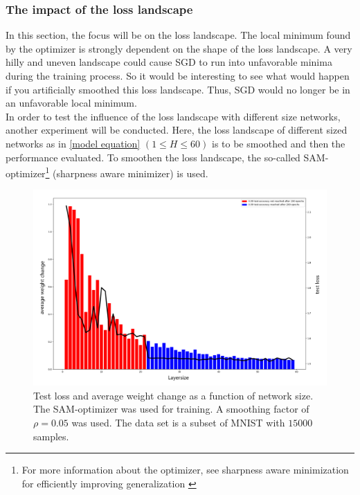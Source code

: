 \newpage
\subsubsection{The impact of the loss landscape}

In this section, the focus will be on the loss landscape. The local minimum found by the optimizer is strongly dependent on the shape of the loss landscape. A very hilly and uneven landscape could cause SGD to run into unfavorable minima during the training process.
So it would be interesting to see what would happen if you artificially smoothed this loss landscape. Thus, SGD would no longer be in an unfavorable local minimum.  \\
In order to test the influence of the loss landscape with different size networks, another experiment will be conducted. Here, the loss landscape of different sized networks as in \ref{model equation} $(1 \leq H \leq 60)$ is to be smoothed and then the performance evaluated. 
To smoothen the loss landscape, the so-called SAM-optimizer\footnote{ For more information about the optimizer, see sharpness aware minimization for efficiently improving generalization \cite{sam_optimizer}
} (sharpness aware minimizer) is used.



\begin{figure}[!htp]
\centering
\includegraphics[scale=0.3]{Abschlussarbeit_2021/LaTeX/images/sam_edited.bmp.png}
\caption{Test loss and average weight change as a function of network size. The SAM-optimizer was used for training\cite{sam_optimizer}. A smoothing factor of $\rho = 0.05$ was used. The data set is a subset of MNIST with $15000$ samples.}
\label{fig:sam}
\end{figure}

